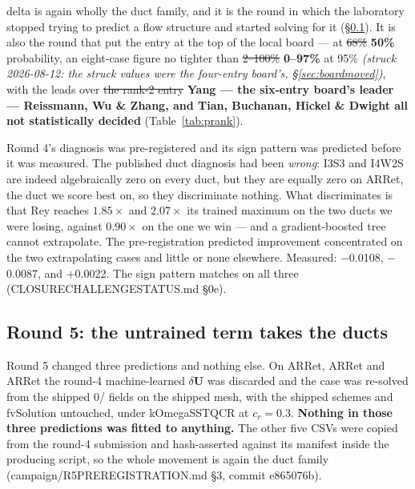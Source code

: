 \documentclass[11pt,a4paper]{article}
\newcommand{\breakus}{\textunderscore\allowbreak}
\newcommand{\code}[1]{{\small\ttfamily\let\_\breakus #1}}
\newcommand{\artifact}[1]{{\footnotesize\ttfamily\let\_\breakus #1}}
\begin{document}
\begin{description}
  delta is again wholly the duct family, and it is the round in which the laboratory
  stopped trying to predict a flow structure and started solving for it
  (\S\ref{sec:round5}). It is also the round that put the entry at the top of the local
  board --- at \sout{68\%} \textbf{50\%} probability, an eight-case figure no tighter than
  \sout{2--100\%} \textbf{0--97\%} at 95\% \emph{(struck 2026-08-12: the struck values were
  the four-entry board's, \S\ref{sec:boardmoved})}, with
  the leads over \sout{the rank-2 entry} \textbf{Yang --- the six-entry board's leader ---
  Reissmann, Wu \& Zhang, and Tian, Buchanan, Hickel \& Dwight all}
  \textbf{not statistically decided} (Table~\ref{tab:prank}).
\end{description}

Round 4's diagnosis was pre-registered and its sign pattern was predicted before it was
measured. The published duct diagnosis had been \emph{wrong}: \code{I3\_S3} and
\code{I4\_W2S} are indeed algebraically zero on every duct, but they are equally zero on
\code{AR\_14\_Ret\_180}, the duct we score best on, so they discriminate nothing. What
discriminates is that \code{Re\_y} reaches $1.85\times$ and $2.07\times$ its trained
maximum on the two ducts we were losing, against $0.90\times$ on the one we win --- and a
gradient-boosted tree cannot extrapolate. The pre-registration predicted improvement
concentrated on the two extrapolating cases and little or none elsewhere. Measured:
$-$0.0108, $-$0.0087, and $+$0.0022. The sign pattern matches on all three
(\artifact{CLOSURE\_CHALLENGE\_STATUS.md} \S0e).

\subsection{Round 5: the untrained term takes the ducts}
\label{sec:round5}

Round 5 changed three predictions and nothing else. On \code{AR\_1\_Ret\_360},
\code{AR\_3\_Ret\_360} and \code{AR\_14\_Ret\_180} the round-4 machine-learned $\delta
\mathbf{U}$ was discarded and the case was re-solved from the shipped \code{0/} fields on
the shipped mesh, with the shipped schemes and \code{fvSolution} untouched, under
\code{kOmegaSSTQCR} at $c_r = 0.3$. \textbf{Nothing in those three predictions was fitted
to anything.} The other five CSVs were copied from the round-4 submission and
hash-asserted against its manifest inside the producing script, so the whole movement is
again the duct family (\artifact{campaign/R5\_PREREGISTRATION.md} \S3, commit
\code{e865076b}).
\end{document}
